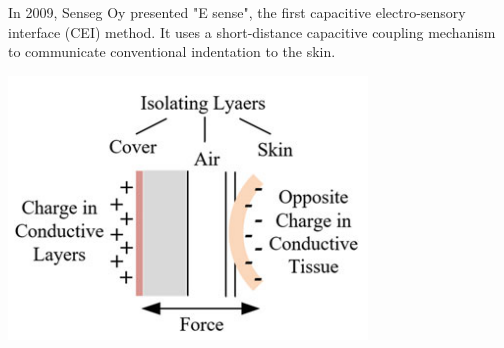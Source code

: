 \documentclass[12pt, a4paper]{article}
\begin{document}
\begin{multicols}{2}
\par In 2009, Senseg Oy presented "E sense", the first capacitive electro-sensory interface (CEI) method. It uses a short-distance capacitive coupling mechanism to communicate conventional indentation to the skin\cite{TBHMI}.

\captionsetup{type=figure}
\includegraphics[width=.49\textwidth]{CEI.png}
\vspace*{3mm}


\end{multicols}
\end{document}
